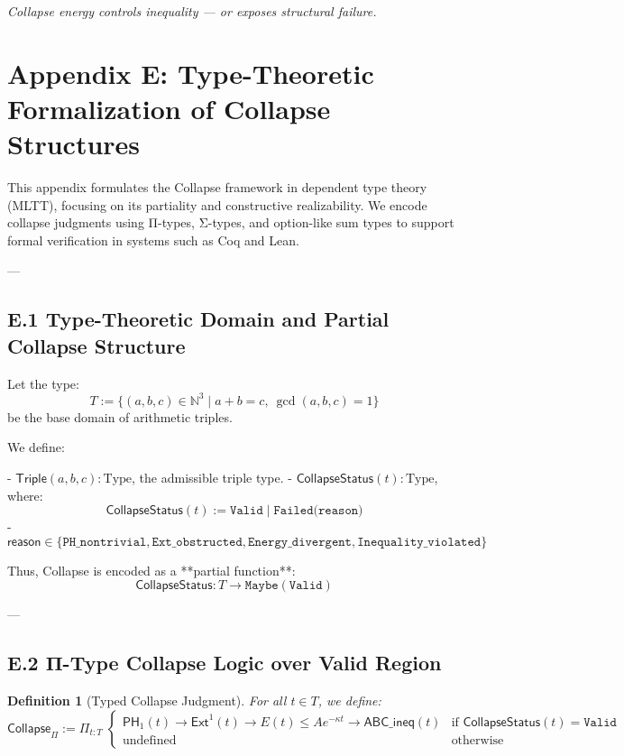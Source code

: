 \documentclass[11pt]{article}
\newtheorem{definition}[theorem]{Definition}
\begin{document}
\begin{center}
\textit{Collapse energy controls inequality — or exposes structural failure.}
\end{center}



\section*{Appendix E: Type-Theoretic Formalization of Collapse Structures}

This appendix formulates the Collapse framework in dependent type theory (MLTT),  
focusing on its partiality and constructive realizability. We encode collapse judgments using  
Π-types, Σ-types, and option-like sum types to support formal verification in systems such as Coq and Lean.

---

\subsection*{E.1 Type-Theoretic Domain and Partial Collapse Structure}

Let the type:
\[
T := \{ (a,b,c) \in \mathbb{N}^3 \mid a + b = c,\ \gcd(a,b,c)=1 \}
\]
be the base domain of arithmetic triples.

We define:

- \( \mathsf{Triple}(a,b,c) : \mathrm{Type} \), the admissible triple type.
- \( \mathsf{CollapseStatus}(t) : \mathrm{Type} \), where:
  \[
  \mathsf{CollapseStatus}(t) := \texttt{Valid} \;|\; \texttt{Failed(reason)}
  \]
- \( \mathsf{reason} \in \{ \texttt{PH\_nontrivial}, \texttt{Ext\_obstructed}, \texttt{Energy\_divergent}, \texttt{Inequality\_violated} \} \)

Thus, Collapse is encoded as a **partial function**:
\[
\mathsf{CollapseStatus} : T \to \texttt{Maybe}(\texttt{Valid})
\]

---

\subsection*{E.2 Π-Type Collapse Logic over Valid Region}

\begin{definition}[Typed Collapse Judgment]
For all \( t \in T \), we define:
\[
\mathsf{Collapse}_\Pi := \Pi_{t:T} \;
\begin{cases}
\mathsf{PH}_1(t) \to \mathsf{Ext}^1(t) \to E(t) \leq Ae^{-\kappa t} \to \mathsf{ABC\_ineq}(t) & \text{if } \mathsf{CollapseStatus}(t) = \texttt{Valid} \\
\text{undefined} & \text{otherwise}
\end{cases}
\]
\end{definition}
\end{document}
